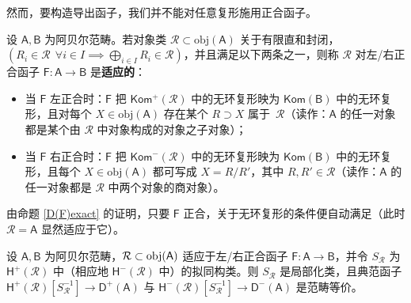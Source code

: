 然而，要构造导出函子，我们并不能对任意复形施用正合函子。

\begin{Def}\label{adaptedclass}
	设 $\mathsf{A}, \mathsf{B}$ 为阿贝尔范畴。若对象类 $\mathcal{R}\subset\text{obj}(\mathsf{A})$ 关于有限直和封闭，$(R_i\in\mathcal{R}\,\;\forall i\in I\implies\bigoplus_{i\in I}R_i\in\mathcal{R})$，并且满足以下两条之一，则称 $\mathcal{R}$ 对左/右正合函子 $\mathsf{F}:\mathsf{A}\rightarrow\mathsf{B}$ 是\textbf{适应的}：
	\begin{itemize}[leftmargin=0.5cm]
		\item 当 $\mathsf{F}$ 左正合时：$\mathsf{F}$ 把 $\mathsf{Kom^+(\mathcal{R})}$ 中的无环复形映为 $\mathsf{Kom(B)}$ 中的无环复形，且对每个 $X\in\text{obj}(\mathsf{A})$ 存在某个 $R\supset X$ 属于~$\mathcal{R}$（读作：$\mathsf{A}$ 的任一对象都是某个由 $\mathcal{R}$ 中对象构成的对象之子对象）；
		
		\item 当 $\mathsf{F}$ 右正合时：$\mathsf{F}$ 把 $\mathsf{Kom^-(\mathcal{R})}$ 中的无环复形映为 $\mathsf{Kom(B)}$ 中的无环复形，且每个 $X\in\text{obj}(\mathsf{A})$ 都可写成 $X=R/R'$，其中 $R, R'\in\mathcal{R}$（读作：$\mathsf{A}$ 的任一对象都是 $\mathcal{R}$ 中两个对象的商对象）。
	\end{itemize}
	由命题 \ref{D(F)exact} 的证明，只要 $\mathsf{F}$ 正合，关于无环复形的条件便自动满足（此时 $\mathcal{R}=\mathsf{A}$ 显然适应于它）。
\end{Def}

\begin{Pro}\label{D(R)equivalent}
	设 $\mathsf{A}, \mathsf{B}$ 为阿贝尔范畴，$\mathcal{R}\subset\textup{obj}(\mathsf{A})$ 适应于左/右正合函子 $\mathsf{F}:\mathsf{A}\rightarrow\mathsf{B}$，并令 $S_\mathcal{R}$ 为 $\mathsf{H^+}(\mathcal{R})$ 中（相应地 $\mathsf{H^-}(\mathcal{R})$ 中）的拟同构类。则 $S_\mathcal{R}$ 是局部化类，且典范函子 $\mathsf{H^+(\mathcal{R})}[S_\mathcal{R}^{-1}]\rightarrow\mathsf{D^+(A)}$ 与 $\mathsf{H^-(\mathcal{R})}[S_\mathcal{R}^{-1}]\rightarrow\mathsf{D^-(A)}$ 是范畴等价。
\end{Pro}

